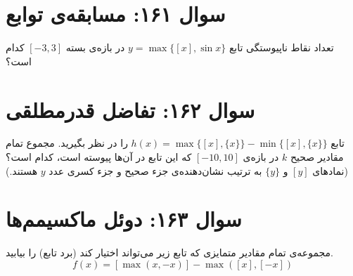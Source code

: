\documentclass[12pt]{article}
\begin{document}
\vspace{1cm}
\hrulefill
\vspace{1cm}

\section*{سوال ۱۶۱: مسابقه‌ی توابع}
تعداد نقاط ناپیوستگی تابع \( y=\max\{[x], \sin x\} \) در بازه‌ی بسته \( [-3, 3] \) کدام است؟

\vspace{1cm}
\hrulefill
\vspace{1cm}

\section*{سوال ۱۶۲: تفاضل قدرمطلقی}
تابع \( h(x) = \max\{[x], \{x\}\} - \min\{[x], \{x\}\} \) را در نظر بگیرید. مجموع تمام مقادیر صحیح \(k\) در بازه‌ی \( [-10, 10] \) که این تابع در آن‌ها پیوسته است، کدام است؟
(نمادهای \( [y] \) و \( \{y\} \) به ترتیب نشان‌دهنده‌ی جزء صحیح و جزء کسری عدد \(y\) هستند.)

\vspace{1cm}
\hrulefill
\vspace{1cm}

\section*{سوال ۱۶۳: دوئل ماکسیمم‌ها}
مجموعه‌ی تمام مقادیر متمایزی که تابع زیر می‌تواند اختیار کند (برد تابع) را بیابید.
\begin{displaymath}
	f(x) = [\max(x, -x)] - \max([x], [-x])
\end{displaymath}

\vspace{1cm}
\hrulefill
\vspace{1cm}

\end{document}
